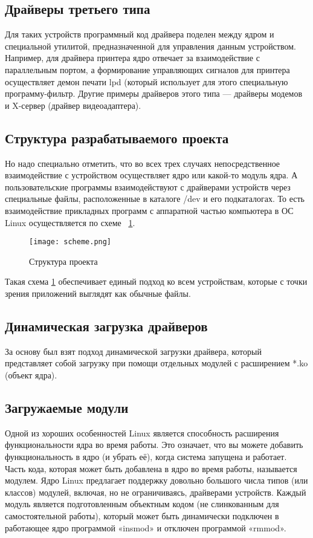 \subsection{Драйверы третьего типа}
Для таких устройств программный код драйвера поделен между ядром и специальной утилитой, предназначенной для управления данным устройством. Например, для драйвера принтера ядро отвечает за взаимодействие с параллельным портом, а формирование управляющих сигналов для принтера осуществляет демон печати lpd (который использует для этого специальную программу-фильтр. Другие примеры драйверов этого типа — драйверы модемов и X-сервер (драйвер видеоадаптера).

\subsection{Структура разрабатываемого проекта}
Но надо специально отметить, что во всех трех случаях непосредственное взаимодействие с устройством осуществляет ядро или какой-то модуль ядра. А пользовательские программы взаимодействуют с драйверами устройств через специальные файлы, расположенные в каталоге /dev и его подкаталогах. То есть взаимодействие прикладных программ с аппаратной частью компьютера в ОС Linux осуществляется по схеме ~\ref{image:scheme}.
 
\begin{figure}[h]
  \centering
  \texttt{[image: scheme.png]}
  \caption{Структура проекта}
  \label{image:scheme}
\end{figure}

Такая схема \ref{image:scheme} обеспечивает единый подход ко всем устройствам, которые с точки зрения приложений выглядят как обычные файлы.

\subsection{Динамическая загрузка драйверов}
За основу был взят подход динамической загрузки драйвера, который представляет собой загрузку при помощи отдельных модулей с расширением *.ko (объект ядра).

\subsection{Загружаемые модули}
Одной из хороших особенностей Linux является способность расширения функциональности ядра во время работы. Это означает, что вы можете добавить функциональность в ядро (и убрать её), когда система запущена и работает. Часть кода, которая может быть добавлена в ядро во время работы, называется модулем. Ядро Linux предлагает поддержку довольно большого числа типов (или классов) модулей, включая, но не ограничиваясь, драйверами устройств. Каждый модуль является подготовленным объектным кодом (не слинкованным для самостоятельной работы), который может быть динамически подключен в работающее ядро программой «insmod» и отключен программой «rmmod». \cite{ldd}

